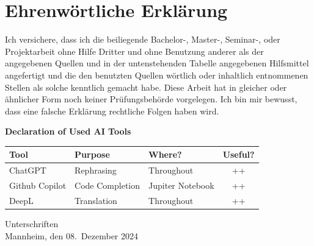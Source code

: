 \documentclass[a4paper,oneside,bibliography=totoc]{scrbook}
\begin{document}
\backmatter


\label{bibliography}

\chapter{Ehrenwörtliche Erklärung}
\label{cha:ehrenwoertlicheErklaerung}

Ich versichere, dass ich die beiliegende Bachelor-, Master-, Seminar-, oder
Projektarbeit ohne Hilfe Dritter und ohne Benutzung anderer als der angegebenen
Quellen und in der untenstehenden Tabelle angegebenen Hilfsmittel angefertigt
und die den benutzten Quellen wörtlich oder inhaltlich entnommenen Stellen als
solche kenntlich gemacht habe. Diese Arbeit hat in gleicher oder ähnlicher Form
noch keiner Prüfungsbehörde vorgelegen. Ich bin mir bewusst, dass eine falsche
Erklärung rechtliche Folgen haben wird.

\begin{center}
  \textbf{Declaration of Used AI Tools} \\[.3em]
  \begin{tabularx}{\textwidth}{lXlc}
    \toprule
    Tool & Purpose & Where? & Useful? \\
    \midrule
    ChatGPT & Rephrasing & Throughout & ++ \\
    Github Copilot & Code Completion & Jupiter Notebook & ++ \\
    DeepL & Translation & Throughout & ++ \\
    \bottomrule
  \end{tabularx}
\end{center}

\vspace{2cm}
\noindent Unterschriften\\
\noindent Mannheim, den 08.~Dezember 2024 \hfill
\end{document}
